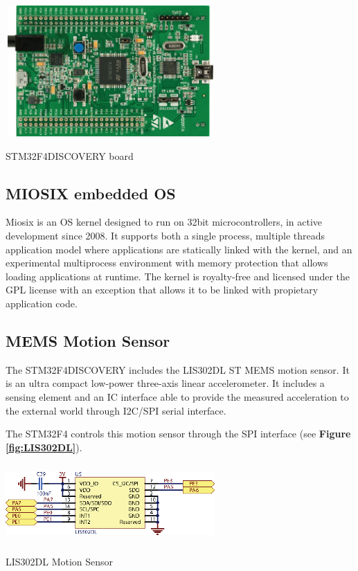 \documentclass[a4paper,10pt]{article}
\makeatletter
\newenvironment{figurehere}{\def\@captype{figure}\vspace{2ex}}{\vspace{1ex}}
\makeatother
\begin{document}
\begin{multicols}{2}
\begin{figurehere}
 \centering
 \includegraphics[width=8cm, height=5cm]{./eps/STM32F4.eps}
 \caption{STM32F4DISCOVERY board}
 \label{fig:STM32F4}
\end{figurehere}

\subsection{MIOSIX embedded OS}

Miosix is an OS kernel designed to run on 32bit microcontrollers, in active development since 2008.
It supports both a single process, multiple threads application model where applications are statically linked with the kernel, and an experimental multiprocess environment with memory protection that allows loading applications at runtime. 
The kernel is royalty-free and licensed under the GPL license with an exception that allows it to be linked with propietary application code. \cite{miosix}

\subsection{MEMS Motion Sensor}

The STM32F4DISCOVERY includes the LIS302DL ST MEMS motion sensor.
It is an ultra compact low-power three-axis linear accelerometer. It includes
a sensing element and an IC interface able to provide the measured acceleration
to the external world through I2C/SPI serial interface.

The STM32F4 controls this motion sensor through the SPI interface (see {\bf Figure
\ref{fig:LIS302DL}}). 

\begin{figurehere}
 \centering
 \includegraphics[width=8cm, height=3cm]{./eps/LIS302DL.eps}
 \caption{LIS302DL Motion Sensor}
 \label{fig:LIS302DL}
\end{figurehere}


\end{multicols}
\end{document}
